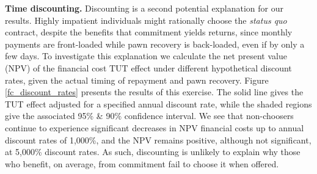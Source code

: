\documentclass[ecta,nameyear,final]{econsocart}
\begin{document}



\noindent \textbf{Time discounting.} Discounting is a second potential explanation for our results. Highly impatient individuals might rationally choose the \emph{status quo} contract, despite the benefits that commitment yields returns, since monthly payments are front-loaded while pawn recovery is back-loaded, even if by only a few days.  
To investigate this explanation we calculate the net present value (NPV) of the financial cost $\text{TUT}$ effect under different hypothetical discount rates, given the actual timing of repayment and pawn recovery. Figure \ref{fc_discount_rates} presents the results of this exercise. 
The solid line gives the TUT effect adjusted for a specified annual discount rate, while the shaded regions give the associated 95\% \& 90\% confidence interval.
We see that non-choosers continue to experience significant decreases in NPV financial costs up to annual discount rates of 1,000\%, and the NPV remains positive, although not significant, at 5,000\% discount rates. As such, discounting is unlikely to explain why those who benefit, on average, from commitment fail to choose it when offered. 
\end{document}
